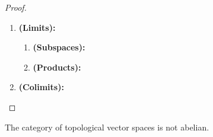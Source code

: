                 \begin{proof}
                    \noindent
                    \begin{enumerate}
                        \item \textbf{(Limits):}
                        \begin{enumerate}
                            \item \textbf{(Subspaces):}
                            \item \textbf{(Products):}
                        \end{enumerate}
                        \item \textbf{(Colimits):}
                    \end{enumerate}
                \end{proof}
            \begin{remark}
                The category of topological vector spaces is not abelian.
            \end{remark}
            
